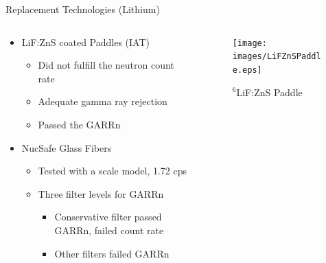 \begin{frame}{Replacement Technologies (Lithium)}
\begin{columns}[onlytextwidth]
\begin{column}{0.45\textwidth}
\begin{itemize}
	\small
	\item LiF:ZnS coated Paddles (IAT) \cite{kouzes_lithium_2010}
	\begin{itemize}
		\item Did not fulfill the neutron count rate
		\item Adequate gamma ray rejection
		\item Passed the GARRn
	\end{itemize}
	\small
	\item NucSafe Glass Fibers\cite{kouzes_alternative_2010}
	\begin{itemize}
		\item Tested with a scale model, 1.72 cps
		\item Three filter levels for GARRn
		\begin{itemize}
			\tiny
			\item Conservative filter passed GARRn, failed count rate
			\item Other filters failed GARRn
		\end{itemize}
	\end{itemize}
\end{itemize}
\end{column}
\begin{column}{0.45\textwidth}
	\begin{figure}
		\texttt{[image: images/LiFZnSPaddle.eps]}
		\caption{${}^6$LiF:ZnS Paddle}
		\label{fig:LifZnSPaddle}

\end{figure}
\end{column}
\end{columns}
\end{frame}
